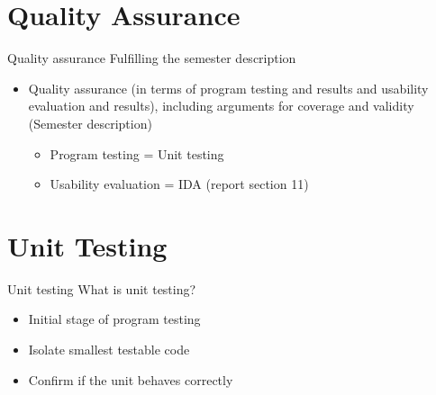 \section{Quality Assurance}

\begin{frame}[fragile] {Quality assurance} {Fulfilling the semester description}
	\begin{itemize}
		\item Quality assurance (in terms of program testing and results and usability evaluation and results), including arguments for coverage and validity {\footnotesize (Semester description)}
		\begin{itemize}
			\item Program testing = Unit testing
			\item Usability evaluation = IDA (report section 11)
		\end{itemize}				
	\end{itemize}

\end{frame}

\section{Unit Testing}

\begin{frame}[fragile] {Unit testing} {What is unit testing?}
	\begin{itemize}
		\item Initial stage of program testing
		\item Isolate smallest testable code
		\item Confirm if the unit behaves correctly
	\end{itemize}
\end{frame}

